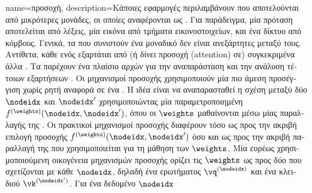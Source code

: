 {name={\foreignlanguage{greek}{προσοχή}}, 
	description={\foreignlanguage{greek}{Κάποιες εφαρμογές}  
		\foreignlanguage{greek}{περιλαμβάνουν}  \foreignlanguage{greek}{που αποτελούνται από μικρότερες
		μονάδες, οι οποίες αναφέρονται ως} . \foreignlanguage{greek}{Για παράδειγμα, μία πρόταση 
		αποτελείται από λέξεις, μία εικόνα από τμήματα εικονοστοιχείων, και ένα δίκτυο από κόμβους. Γενικά,
		τα}  \foreignlanguage{greek}{που συνιστούν ένα μοναδικό}  
		\foreignlanguage{greek}{δεν είναι ανεξάρτητες μεταξύ τους. Αντίθετα, κάθε}  
		\foreignlanguage{greek}{ενός}  \foreignlanguage{greek}{εξαρτάται από (ή δίνει προσοχή} 
		(attention) \foreignlanguage{greek}{σε) συγκεκριμένα άλλα} .
		\foreignlanguage{greek}{Τα}  \foreignlanguage{greek}{παρέχουν ένα πλαίσιο αρχών για την 
		αναπαράσταση και την ανάλυση τέτοιων εξαρτήσεων} \cite{Blei2003}. \foreignlanguage{greek}{Οι μηχανισμοί προσοχής 
		χρησιμοποι\-ούν μία πιο άμεση προσέγγιση χωρίς ρητή αναφορά σε ένα} . 
		\foreignlanguage{greek}{Η ιδέα είναι να αναπαρασταθεί η σχέση μεταξύ δύο}  $\nodeidx$ 
		\foreignlanguage{greek}{και} $\nodeidx'$ \foreignlanguage{greek}{χρησιμοποιώντας μία παραμετροποιημένη} 
		 $f^{(\weights)}(\nodeidx,\nodeidx')$, \foreignlanguage{greek}{όπου οι}  
		$\weights$ \foreignlanguage{greek}{μαθαίνονται μέσω μίας 
		παραλλαγής της} . \foreignlanguage{greek}{Οι πρακτικοί μηχανισμοί προσοχής διαφέρουν τόσο ως προς
		την ακριβή επιλογή}  \foreignlanguage{greek}{προσοχής $f^{(\weights)}(\nodeidx,\nodeidx')$ όσο και 
		ως προς την ακριβή παραλλαγή της}  \foreignlanguage{greek}{που χρησιμοποιείται για τη μάθηση των} 
		 $\weights$. \foreignlanguage{greek}{Μία ευρέως χρησιμοποιούμενη οικογένεια μηχανισμών προσοχής
		ορίζει τις}  $\weights$ \foreignlanguage{greek}{ως προς δύο}  
		\foreignlanguage{greek}{που σχετίζονται με κάθε}  $\nodeidx$, \foreignlanguage{greek}{δηλαδή
		ένα}  \foreignlanguage{greek}{ερωτήματος $\vq^{(\nodeidx)}$ και ένα}  
		\foreignlanguage{greek}{κλειδιού $\vk^{(\nodeidx')}$. Για ένα δεδομένο}  $\nodeidx$ 
}}
